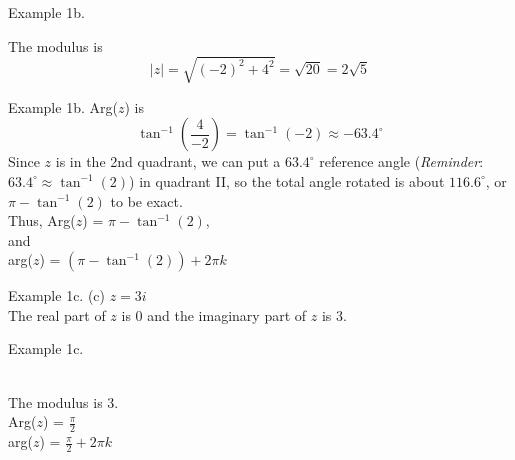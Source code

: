 \documentclass[t,usenames,dvipsnames]{beamer}
\begin{document}
\begin{frame}{Example 1b.}
    \begin{center}
    \end{center}
\pause
The modulus is
\[
|z| = \sqrt{(-2)^2 + 4^2} = \sqrt{20} = 2\sqrt{5}
\]
\end{frame}


\begin{frame}{Example 1b.}
    Arg($z$) is
    \[
    \tan^{-1} \left(\frac{4}{-2}\right) = \tan^{-1}(-2) \approx -63.4^\circ
    \]
\pause
Since $z$ is in the 2nd quadrant, we can put a $63.4^\circ$ reference angle (\emph{Reminder}: $63.4^\circ \approx \tan^{-1}(2)$) in quadrant II, so the total angle rotated is about $116.6^\circ$, or $\pi - \tan^{-1}(2)$ to be exact.   \newline\\      \pause
Thus, Arg($z$) = $\pi - \tan^{-1}(2)$, \newline\\
\pause  and \newline\\
arg($z$) = $\left(\pi - \tan^{-1}(2)\right) + 2\pi k$
\end{frame}

\begin{frame}{Example 1c.}
    (c) \quad   $z = 3i$  \newline\\
    \pause
    The real part of $z$ is 0 and the imaginary part of $z$ is $3$.
\end{frame}

\begin{frame}{Example 1c.}
\begin{center}
\newline\\
\pause
The modulus is 3.   \newline\\
\pause 
Arg($z$) = $\frac{\pi}{2}$  \newline\\
\pause
arg($z$) = $\frac{\pi}{2} + 2\pi k$
\end{center}
\end{frame}
\end{document}
